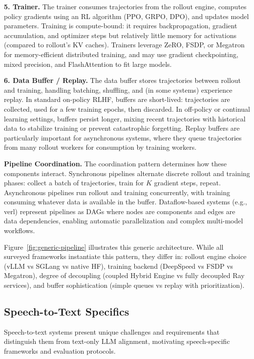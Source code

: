 \documentclass[conference]{IEEEtran}
\begin{document}
\textbf{5. Trainer.} The trainer consumes trajectories from the rollout engine, computes policy gradients using an RL algorithm (PPO, GRPO, DPO), and updates model parameters. Training is compute-bound: it requires backpropagation, gradient accumulation, and optimizer steps but relatively little memory for activations (compared to rollout's KV caches). Trainers leverage ZeRO, FSDP, or Megatron for memory-efficient distributed training, and may use gradient checkpointing, mixed precision, and FlashAttention to fit large models.

\textbf{6. Data Buffer / Replay.} The data buffer stores trajectories between rollout and training, handling batching, shuffling, and (in some systems) experience replay. In standard on-policy RLHF, buffers are short-lived: trajectories are collected, used for a few training epochs, then discarded. In off-policy or continual learning settings, buffers persist longer, mixing recent trajectories with historical data to stabilize training or prevent catastrophic forgetting. Replay buffers are particularly important for asynchronous systems, where they queue trajectories from many rollout workers for consumption by training workers.

\textbf{Pipeline Coordination.} The coordination pattern determines how these components interact. Synchronous pipelines alternate discrete rollout and training phases: collect a batch of trajectories, train for $K$ gradient steps, repeat. Asynchronous pipelines run rollout and training concurrently, with training consuming whatever data is available in the buffer. Dataflow-based systems (e.g., verl) represent pipelines as DAGs where nodes are components and edges are data dependencies, enabling automatic parallelization and complex multi-model workflows.

Figure~\ref{fig:generic-pipeline} illustrates this generic architecture. While all surveyed frameworks instantiate this pattern, they differ in: rollout engine choice (vLLM vs SGLang vs native HF), training backend (DeepSpeed vs FSDP vs Megatron), degree of decoupling (coupled Hybrid Engine vs fully decoupled Ray services), and buffer sophistication (simple queues vs replay with prioritization).

\subsection{Speech-to-Text Specifics}

Speech-to-text systems present unique challenges and requirements that distinguish them from text-only LLM alignment, motivating speech-specific frameworks and evaluation protocols.
\end{document}
